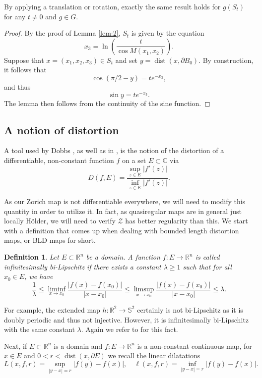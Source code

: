 \documentclass[11pt]{amsart}
\newtheorem{definition}[theorem]{Definition}
\numberwithin{equation}{section}
\theoremstyle{definition}
\theoremstyle{definition}
\theoremstyle{definition}
\newcommand{\R}{\mathbb{R}}
\newcommand{\C}{\mathbb{C}}
\renewcommand{\S}{\mathbb{S}}
\begin{document}
By applying a translation or rotation, exactly the same result holds for $g(S_t)$ for any $t\neq 0$ and $g\in G$.

\begin{proof}
By the proof of Lemma \ref{lem:2}, $S_t$ is given by the equation
\[ x_3 = \ln \left ( \frac{ t}{\cos M(x_1,x_2) } \right ).\]
Suppose that $x = (x_1,x_2,x_3) \in S_t$ and set $y = \operatorname{dist}(x,\partial B_0)$. By construction, it follows that
\[ \cos (\pi/2 - y) = t e^{-x_3},\]
and thus
\[ \sin y = te^{-x_3}.\]
The lemma then follows from the continuity of the sine function.
\end{proof}


\subsection{A notion of distortion}

A tool used by Dobbs \cite{Dob15}, as well as in \cite{VPS19}, is the notion of the distortion of a differentiable, non-constant function $f$ on a set $E\subset \C$ via
\[ D(f,E) = \frac{ \sup_{z\in E} |f'(z)| }{\inf_{z\in E} |f'(z)|} .\]

As our Zorich map is not differentiable everywhere, we will need to modify this quantity in order to utilize it. In fact, as quasiregular maps are in general just locally H\"older, we will need to verify $\mathcal{Z}$ has better regularity than this. We start with a definition that comes up when dealing with bounded length distortion maps, or BLD maps for short.

\begin{definition}
    \label{def:infbilip}
Let $E \subset \R^n$ be a domain. A function $f:E \to \R^n$ is called infinitesimally bi-Lipschitz if there exists a constant $\lambda \geq 1$ such that for all $x_0 \in E$, we have
\[ \frac{1}{\lambda} \leq \liminf_{x\to x_0} \frac{ |f(x) - f(x_0) |}{|x-x_0|} \leq \limsup_{x\to x_0} \frac{ |f(x) - f(x_0)| }{|x-x_0|} \leq \lambda .\]
\end{definition}

For example, the extended map $h:\R^2 \to \S^2$ certainly is not bi-Lipschitz as it is doubly periodic and thus not injective. However, it is infinitesimally bi-Lipschitz with the same constant $\lambda$. Again we refer to \cite[Appendix A2]{FlePra21} for this fact.

Next, if $E\subset \R^n$ is a domain and $f:E \to \R^n$ is a non-constant continuous map, for $x\in E$ and $0<r<\operatorname{dist}(x,\partial E)$ we recall the linear dilatations
\[ L(x,f,r) = \sup_{|y-x| = r} |f(y) - f(x)|, \quad \ell(x,f,r) = \inf_{|y-x|=r} |f(y)-f(x)|.\]
\end{document}
